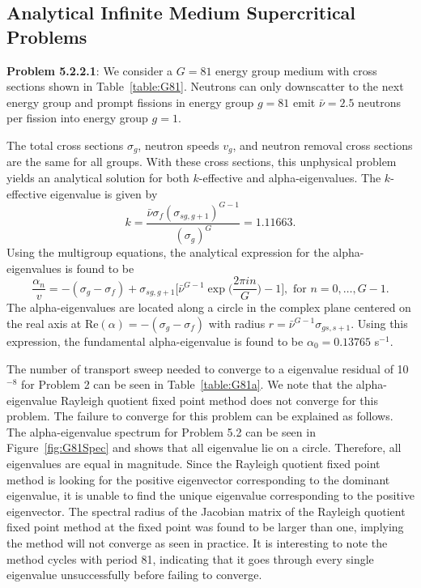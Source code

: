 \subsection{Analytical Infinite Medium Supercritical Problems}


\textbf{Problem 5.2.2.1}: We consider a $G = 81$ energy group medium with cross sections shown in Table~\ref{table:G81}. Neutrons can only downscatter to the next energy group and prompt fissions in energy group $g = 81$ emit $\bar{\nu} = 2.5$ neutrons per fission into energy group $g = 1$.

The total cross sections $\sigma_{g}$, neutron speeds $v_{g}$, and neutron removal cross sections are the same for all groups. With these cross sections, this unphysical problem yields an analytical solution for both $k$-effective and alpha-eigenvalues. The $k$-effective eigenvalue is given by
\begin{equation}
	k = \frac{\bar{\nu} \sigma_{f} (\sigma_{sg,g+1})^{G-1}}{(\sigma_{g})^{G}} = 1.11663.
\end{equation}
Using the multigroup equations, the analytical expression for the alpha-eigenvalues is found to be
\begin{equation}
\frac{\alpha_{n}}{v} = -(\sigma_{g} - \sigma_{f}) + \sigma_{sg,g+1} \bigg [ \bar{\nu}^{G-1} \exp \bigg ( \frac{2 \pi i n}{G} \bigg ) - 1 \bigg ], \text{ for } n = 0, \dots, G-1. 
\end{equation}
The alpha-eigenvalues are located along a circle in the complex plane centered on the real axis at $\text{Re}(\alpha) = -(\sigma_{g} - \sigma_{f})$ with radius $r = \bar{\nu}^{G-1} \sigma_{gs,s+1}$. Using this expression, the fundamental alpha-eigenvalue is found to be $\alpha_{0} = 0.13765$ s$^{-1}$. 

The number of transport sweep needed to converge to a eigenvalue residual of 10$^{-8}$ for Problem 2 can be seen in Table~\ref{table:G81a}. We note that the alpha-eigenvalue Rayleigh quotient fixed point method does not converge for this problem. The failure to converge for this problem can be explained as follows. The alpha-eigenvalue spectrum for Problem 5.2 can be seen in Figure~\ref{fig:G81Spec} and shows that all eigenvalue lie on a circle. Therefore, all eigenvalues are equal in magnitude. Since the Rayleigh quotient fixed point method is looking for the positive eigenvector corresponding to the dominant eigenvalue, it is unable to find the unique eigenvalue corresponding to the positive eigenvector. The spectral radius of the Jacobian matrix of the Rayleigh quotient fixed point method at the fixed point was found to be larger than one, implying the method will not converge as seen in practice. It is interesting to note the method cycles with period 81, indicating that it goes through every single eigenvalue unsuccessfully before failing to converge.


